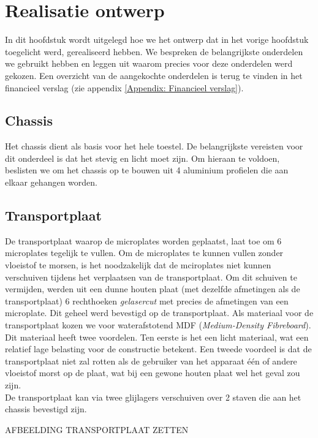 \documentclass[a4paper,twoside,kulak]{kulakreport} %
\begin{document}
\chapter{Realisatie ontwerp}

In dit hoofdstuk wordt uitgelegd hoe we het ontwerp dat in het vorige hoofdstuk toegelicht werd, gerealiseerd hebben. We bespreken de belangrijkste onderdelen we gebruikt hebben en leggen uit waarom precies voor deze onderdelen werd gekozen. Een overzicht van de aangekochte onderdelen is terug te vinden in het financieel verslag (zie appendix \ref{Appendix: Financieel verslag}).

\section{Chassis}

Het chassis dient als basis voor het hele toestel. De belangrijkste vereisten voor dit onderdeel is dat het stevig en licht moet zijn. Om hieraan te voldoen, beslisten we om het chassis op te bouwen uit 4 aluminium profielen die aan elkaar gehangen worden. 

\section{Transportplaat}

De transportplaat waarop de microplates worden geplaatst, laat toe om 6 microplates tegelijk te vullen. Om de microplates te kunnen vullen zonder vloeistof te morsen, is het noodzakelijk dat de mciroplates niet kunnen verschuiven tijdens het verplaatsen van de transportplaat. Om dit schuiven te vermijden, werden uit een dunne houten plaat (met dezelfde afmetingen als de transportplaat) 6 rechthoeken \textit{gelasercut} met precies de afmetingen van een microplate. Dit geheel werd bevestigd op de transportplaat. Als materiaal voor de transportplaat kozen we voor waterafstotend MDF (\textit{Medium-Density Fibreboard}). Dit materiaal heeft twee voordelen. Ten eerste is het een licht materiaal, wat een relatief lage belasting voor de constructie betekent. Een tweede voordeel is dat de transportplaat niet zal rotten als de gebruiker van het apparaat één of andere vloeistof morst op de plaat, wat bij een gewone houten plaat wel het geval zou zijn.  \\
De transportplaat kan via twee glijlagers verschuiven over 2 staven die aan het chassis bevestigd zijn.  

AFBEELDING TRANSPORTPLAAT ZETTEN
\end{document}
